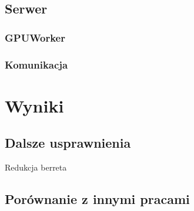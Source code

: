 \subsection{Serwer}

\subsubsection{GPUWorker}

\subsubsection{Komunikacja}

\section{Wyniki}

\subsection{Dalsze usprawnienia}
Redukcja berreta

\subsection{Porównanie z innymi pracami}